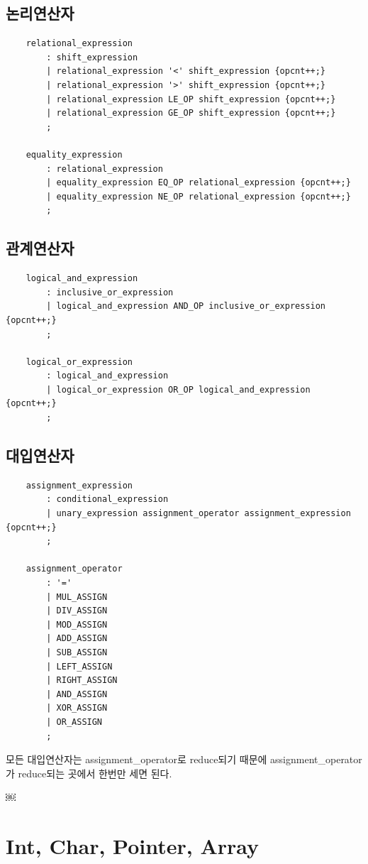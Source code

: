 \documentclass{oblivoir}
\begin{document}
\subsection{논리연산자}
\begin{verbatim}
    relational_expression
        : shift_expression
        | relational_expression '<' shift_expression {opcnt++;}
        | relational_expression '>' shift_expression {opcnt++;}
        | relational_expression LE_OP shift_expression {opcnt++;}
        | relational_expression GE_OP shift_expression {opcnt++;}
        ;

    equality_expression
        : relational_expression
        | equality_expression EQ_OP relational_expression {opcnt++;}
        | equality_expression NE_OP relational_expression {opcnt++;}
        ;
\end{verbatim}
\subsection{관계연산자}
\begin{verbatim}
    logical_and_expression
        : inclusive_or_expression
        | logical_and_expression AND_OP inclusive_or_expression {opcnt++;}
        ;

    logical_or_expression
        : logical_and_expression
        | logical_or_expression OR_OP logical_and_expression {opcnt++;}
        ;
\end{verbatim}
\subsection{대입연산자}
\begin{verbatim}
    assignment_expression
        : conditional_expression
        | unary_expression assignment_operator assignment_expression {opcnt++;}
        ;

    assignment_operator
        : '='
        | MUL_ASSIGN
        | DIV_ASSIGN
        | MOD_ASSIGN
        | ADD_ASSIGN
        | SUB_ASSIGN
        | LEFT_ASSIGN
        | RIGHT_ASSIGN
        | AND_ASSIGN
        | XOR_ASSIGN
        | OR_ASSIGN
        ;
\end{verbatim}
모든 대입연산자는 assignment\_operator로 reduce되기 때문에 assignment\_operator가 reduce되는 곳에서 한번만 세면 된다.



￼
\section{Int, Char, Pointer, Array}
\end{document}
